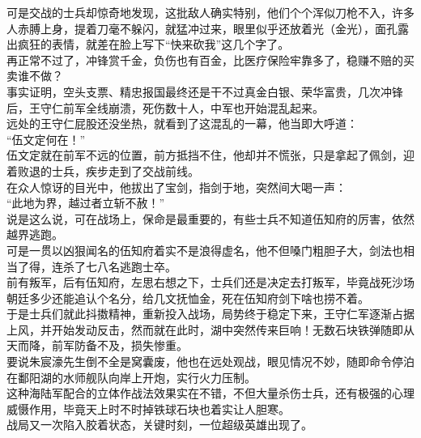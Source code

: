 \begin{multicols}{\theparacolNo}
可是交战的士兵却惊奇地发现，这批敌人确实特别，他们个个浑似刀枪不入，许多人赤膊上身，提着刀毫不躲闪，就猛冲过来，眼里似乎还放着光（金光），面孔露出疯狂的表情，就差在脸上写下“快来砍我”这几个字了。\\

再正常不过了，冲锋赏千金，负伤也有百金，比医疗保险牢靠多了，稳赚不赔的买卖谁不做？\\

事实证明，空头支票、精忠报国最终还是干不过真金白银、荣华富贵，几次冲锋后，王守仁前军全线崩溃，死伤数十人，中军也开始混乱起来。\\

远处的王守仁屁股还没坐热，就看到了这混乱的一幕，他当即大呼道：\\

“伍文定何在！”\\

伍文定就在前军不远的位置，前方抵挡不住，他却并不慌张，只是拿起了佩剑，迎着败退的士兵，疾步走到了交战前线。\\

在众人惊讶的目光中，他拔出了宝剑，指剑于地，突然间大喝一声：\\

“此地为界，越过者立斩不赦！”\\

说是这么说，可在战场上，保命是最重要的，有些士兵不知道伍知府的厉害，依然越界逃跑。\\

可是一贯以凶狠闻名的伍知府着实不是浪得虚名，他不但嗓门粗胆子大，剑法也相当了得，连杀了七八名逃跑士卒。\\

前有叛军，后有伍知府，左思右想之下，士兵们还是决定去打叛军，毕竟战死沙场朝廷多少还能追认个名分，给几文抚恤金，死在伍知府剑下啥也捞不着。\\

于是士兵们就此抖擞精神，重新投入战场，局势终于稳定下来，王守仁军逐渐占据上风，并开始发动反击，然而就在此时，湖中突然传来巨响！无数石块铁弹随即从天而降，前军防备不及，损失惨重。\\

要说朱宸濠先生倒不全是窝囊废，他也在远处观战，眼见情况不妙，随即命令停泊在鄱阳湖的水师舰队向岸上开炮，实行火力压制。\\

这种海陆军配合的立体作战法效果实在不错，不但大量杀伤士兵，还有极强的心理威慑作用，毕竟天上时不时掉铁球石块也着实让人胆寒。\\

战局又一次陷入胶着状态，关键时刻，一位超级英雄出现了。\\


\end{multicols}
